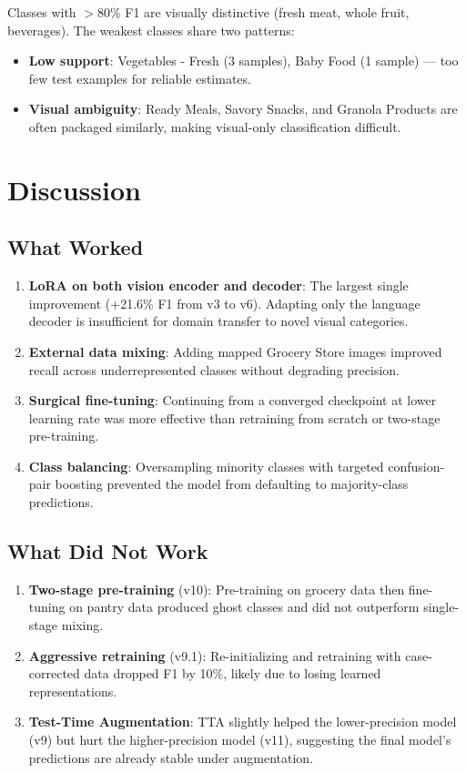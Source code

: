 \documentclass[11pt]{article}
\begin{document}
Classes with $>$80\% F1 are visually distinctive (fresh meat, whole fruit, beverages). The weakest classes share two patterns:
\begin{itemize}[nosep]
\item \textbf{Low support}: Vegetables - Fresh (3 samples), Baby Food (1 sample) — too few test examples for reliable estimates.
\item \textbf{Visual ambiguity}: Ready Meals, Savory Snacks, and Granola Products are often packaged similarly, making visual-only classification difficult.
\end{itemize}

\section{Discussion}

\subsection{What Worked}

\begin{enumerate}[nosep]
\item \textbf{LoRA on both vision encoder and decoder}: The largest single improvement (+21.6\% F1 from v3 to v6). Adapting only the language decoder is insufficient for domain transfer to novel visual categories.
\item \textbf{External data mixing}: Adding mapped Grocery Store images improved recall across underrepresented classes without degrading precision.
\item \textbf{Surgical fine-tuning}: Continuing from a converged checkpoint at lower learning rate was more effective than retraining from scratch or two-stage pre-training.
\item \textbf{Class balancing}: Oversampling minority classes with targeted confusion-pair boosting prevented the model from defaulting to majority-class predictions.
\end{enumerate}

\subsection{What Did Not Work}

\begin{enumerate}[nosep]
\item \textbf{Two-stage pre-training} (v10): Pre-training on grocery data then fine-tuning on pantry data produced ghost classes and did not outperform single-stage mixing.
\item \textbf{Aggressive retraining} (v9.1): Re-initializing and retraining with case-corrected data dropped F1 by 10\%, likely due to losing learned representations.
\item \textbf{Test-Time Augmentation}: TTA slightly helped the lower-precision model (v9) but hurt the higher-precision model (v11), suggesting the final model's predictions are already stable under augmentation.
\end{enumerate}
\end{document}
